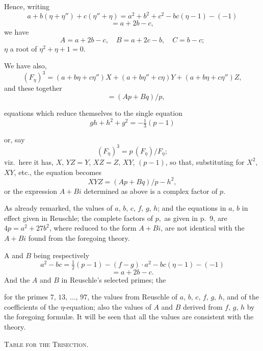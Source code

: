 \documentclass[11pt]{article}
\begin{document}
\medskip

\noindent
Hence, writing
\[
a + b(\eta + \eta'') + c(\eta'' + \eta) = a^2 + b^2 + c^2 - bc(\eta - 1) - (-1)
\]
\[
= a + 2b - c,
\]
we have
\[
A = a + 2b - c,\quad B = a + 2c - b,\quad C = b - c;
\]
$\eta$ a root of $\eta^2 + \eta + 1 = 0$.

\medskip

\noindent
We have also,
\[
(F_\eta)^3 = (a + b\eta + c\eta'')X + (a + b\eta'' + c\eta)Y + (a + b\eta + c\eta'')Z,
\]
and these together
\[
\quad = (Ap + Bq)/p,
\]

\noindent
equations which reduce themselves to the single equation
\[
gh + h^2 + g^2 = -\tfrac{1}{3}(p - 1)
\]

\medskip

\noindent
or, say
\[
(F_\eta)^3 = p\,(F_\eta)/F_\eta;
\]
viz.\ here it has, $X,\,YZ = Y,\,XZ = Z,\,XY$, $(p - 1)$, so that, substituting for $X^2,$
$XY$, etc., the equation becomes
\[
XYZ = (Ap + Bq)/p - h^2,
\]
or the expression $A + Bi$ determined as above is a complex factor of $p$.

\medskip

\noindent
As already remarked, the values of $a,\,b,\,c,\,f,\,g,\,h$; and the equations in $a,\,b$ in effect
given in Reuschle; the complete factors of $p,$ as given in p.~9, are $4 p = a^2 + 27b^2$, where
reduced to the form $A + Bi$, are not identical with the $A + Bi$ found from the foregoing theory.

\noindent
A and $B$ being respectively
\[
a^2 - bc = \tfrac{1}{2}(p - 1) - (f - g) \cdot a^2 - bc(\eta - 1) - (-1)
\]
\[
= a + 2b - c.
\]
And the $A$ and $B$ in Reuschle's selected primes; the
\newpage

\noindent
for the primes $7,\, 13,\, \ldots,\, 97$, the values from Reuschle of $a,\,b,\,c,\,f,\,g,\,h$, and of the
coefficients of the $\eta$-equation; also the values of $A$ and $B$ derived from $f,\,g,\,h$ by the
foregoing formul\ae. It will be seen that all the values are consistent with the theory.

\bigskip

\begin{center}
\textsc{Table for the Trisection.}
\end{center}

\medskip
\end{document}
